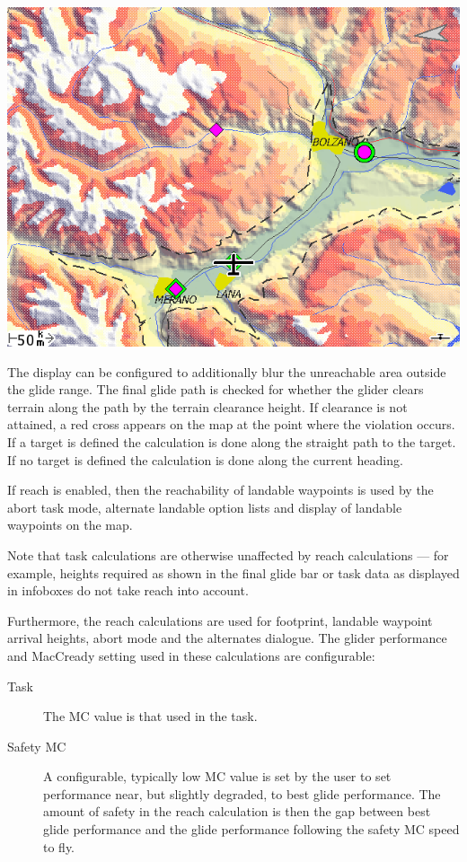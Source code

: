 \begin{description}
\begin{center}
\includegraphics[angle=0,width=0.8\linewidth,keepaspectratio='true']{figures/reach2.png}
\end{center}

\end{description}

The display can be configured to additionally blur the unreachable area
outside the glide range. 
The final glide path is checked for whether the glider clears terrain along
the path by the terrain clearance height.  If clearance is not attained, a red
cross appears on the map at the point where the violation occurs. If a target is
defined the calculation is done along the straight path to the target. If no 
target is defined the calculation is done along the current heading.

If reach is enabled, then the reachability of landable waypoints is used
by the abort task mode, alternate landable option lists and display of
landable waypoints on the map.

Note that task calculations are otherwise unaffected by reach
calculations --- for example, heights required as shown in the final
glide bar or task data as displayed in infoboxes do not take reach into account.

Furthermore, the reach calculations are used for footprint, landable
waypoint arrival heights, abort mode and the alternates dialogue.  The glider
performance and MacCready setting used in these calculations are configurable:
\begin{description}
\item[Task] The MC value is that used in the task.
\item[Safety MC] A configurable, typically low MC value is set by the user to set
  performance near, but slightly degraded, to best glide performance. The amount of safety 
  in the reach calculation is then the gap between best glide performance and the glide
  performance following the safety MC speed to fly. 
\end{description}

